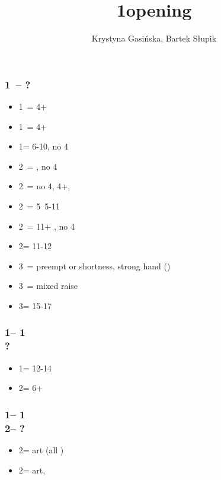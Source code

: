 \documentclass[12pt, a4paper]{article}
\title{1\diams opening}
\author{Krystyna Gasińska, Bartek Słupik}
\begin{document}
\maketitle


\subsubsection*{1\diams\ -- ?}
\begin{itemize}
    \item 1\hearts\ = 4+\hearts
    \item 1\spades\ = 4+\spades
    \item 1\nt = 6-10, no 4\major
    \item 2\clubs\ = \gf, no 4\major
    \item 2\diams\ = no 4\major, 4+\diams, \invp
    \item 2\hearts\ = 5\hearts\ 5-11
    \item 2\spades\ = 11+ \bal, no 4\major
    \item 2\nt = 11-12 \bal
    \item 3\clubs\ = \diams preempt or shortness, strong hand (\diams)
    \item 3\diams\ = mixed raise
    \item 3\nt = 15-17 \bal
\end{itemize}

\subsubsection*{1\diams -- 1\hearts\\ ?}
\begin{itemize}
    \item 1\nt = 12-14 \bal
    \item 2\diams = 6+\diams
\end{itemize}

\subsubsection*{1\diams -- 1\hearts\\
                2\diams -- ?}
\begin{itemize}
    \item 2\spades = \gf art (\then all \nat) \vimp
    \item 2\nt = \inv art, \fton{3\diams} \vimp
\end{itemize}
\end{document}
